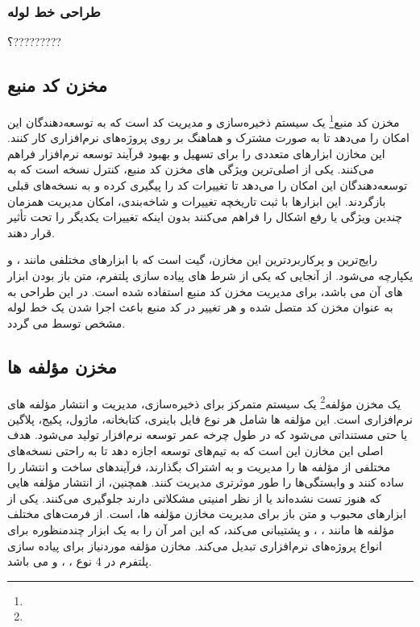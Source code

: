 \subsubsection{طراحی خط لوله}
؟?????????
\subsection{مخزن کد منبع}

مخزن کد منبع\footnote{} یک سیستم ذخیره‌سازی و مدیریت کد است که به توسعه‌دهندگان این امکان را می‌دهد تا به صورت مشترک و هماهنگ بر روی پروژه‌های نرم‌افزاری کار کنند. این مخازن ابزارهای متعددی را برای تسهیل و بهبود فرآیند توسعه نرم‌افزار فراهم می‌کنند. یکی از اصلی‌ترین ویژگی های مخزن کد منبع، کنترل نسخه است که به توسعه‌دهندگان این امکان را می‌دهد تا تغییرات کد را پیگیری کرده و به نسخه‌های قبلی بازگردند. این ابزارها با ثبت تاریخچه تغییرات و شاخه‌بندی، امکان مدیریت همزمان چندین ویژگی یا رفع اشکال را فراهم می‌کنند بدون اینکه تغییرات یکدیگر را تحت تأثیر قرار دهند.

رایج‌ترین و پرکاربردترین این مخازن، گیت است که با ابزارهای مختلفی مانند ،  و  یکپارچه می‌شود. از آنجایی که یکی از شرط های پیاده سازی پلتفرم، متن باز بودن ابزار های آن می باشد،  برای مدیریت مخزن کد منبع استفاده شده است. در این طراحی  به  به عنوان مخزن کد متصل شده و هر تغییر در کد منبع باعث اجرا شدن یک خط لوله  مشخص توسط  می گردد.

\subsection{مخزن مؤلفه ها}
یک مخزن مؤلفه\footnote{} یک سیستم متمرکز برای ذخیره‌سازی، مدیریت و انتشار مؤلفه های نرم‌افزاری است. این مؤلفه ها شامل هر نوع فایل باینری، کتابخانه، ماژول، پکیج، پلاگین یا حتی مستنداتی می‌شود که در طول چرخه عمر توسعه نرم‌افزار تولید می‌شود. هدف اصلی این مخازن این است که به تیم‌های توسعه اجازه دهد تا به راحتی نسخه‌های مختلفی از مؤلفه ها را مدیریت و به اشتراک بگذارند، فرآیندهای ساخت و انتشار را ساده کنند و وابستگی‌ها را طور موثرتری مدیریت کنند. همچنین، از انتشار مؤلفه هایی که هنوز تست نشده‌اند یا از نظر امنیتی مشکلاتی دارند جلوگیری می‌کنند. 
یکی از ابزارهای محبوب و متن باز برای مدیریت مخازن مؤلفه ها،  است.  از فرمت‌های مختلف مؤلفه ها مانند ، ،  و  پشتیبانی می‌کند، که این امر آن را به یک ابزار چندمنظوره برای انواع پروژه‌های نرم‌افزاری تبدیل می‌کند. مخازن مؤلفه موردنیاز برای پیاده سازی پلتفرم در 4 نوع ، ،  و  می باشد.

